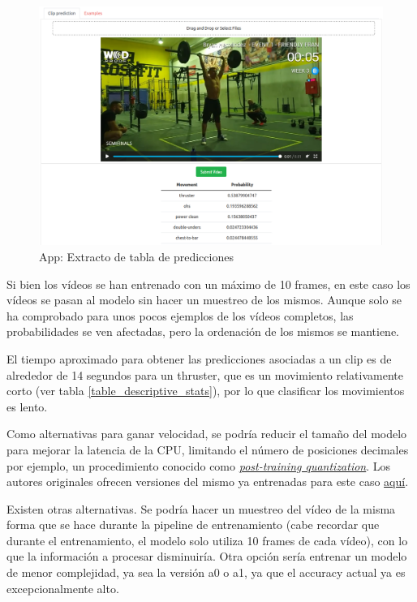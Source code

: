 \begin{figure}[H]
    \centering
		\includegraphics[width=\textwidth]{figs/app_3.png}
\caption{App: Extracto de tabla de predicciones}\label{app_3}
\end{figure}

Si bien los vídeos se han entrenado con un máximo de 10 frames, en este caso los vídeos se pasan al modelo sin hacer un muestreo de los mismos. Aunque solo se ha comprobado para unos pocos ejemplos de los vídeos completos, las probabilidades se ven afectadas, pero la ordenación de los mismos se mantiene.

El tiempo aproximado para obtener las predicciones asociadas a un clip es de alrededor de 14 segundos para un thruster, que es un movimiento relativamente corto (ver tabla \ref{table_descriptive_stats}), por lo que clasificar los movimientos es lento.

Como alternativas para ganar velocidad, se podría reducir el tamaño del modelo para mejorar la latencia de la CPU, limitando el número de posiciones decimales por ejemplo, un procedimiento conocido como \href{https://www.tensorflow.org/lite/performance/post_training_quantization}{\textit{post-training quantization}}. Los autores originales ofrecen versiones del mismo ya entrenadas para este caso \href{https://tfhub.dev/google/collections/movinet/1}{aquí}.

Existen otras alternativas. Se podría hacer un muestreo del vídeo de la misma forma que se hace durante la pipeline de entrenamiento (cabe recordar que durante el entrenamiento, el modelo solo utiliza 10 frames de cada vídeo), con lo que la información a procesar disminuiría. Otra opción sería entrenar un modelo de menor complejidad, ya sea la versión a0 o a1, ya que el accuracy actual ya es excepcionalmente alto.



